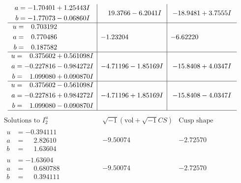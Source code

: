 \documentclass[1p]{elsarticle_modified}
\theoremstyle{definition}
\newcommand{\I}{\sqrt{-1}}
\begin{document}
$$\begin{array}{c|c|c}
\begin{aligned}
a &= -1.70401 + 1.25443 I \\
b &= -1.77073 - 0.06860 I\end{aligned}
 & \phantom{-}19.3766 - 6.2041 I & -18.9481 + 3.7555 I \\ \hline\begin{aligned}
u &= \phantom{-}0.703192\phantom{ +0.000000I} \\
a &= \phantom{-}0.770486\phantom{ +0.000000I} \\
b &= \phantom{-}0.187582\phantom{ +0.000000I}\end{aligned}
 & -1.23204\phantom{ +0.000000I} & -6.62220\phantom{ +0.000000I} \\ \hline\begin{aligned}
u &= \phantom{-}0.375602 + 0.561098 I \\
a &= -0.227816 - 0.984272 I \\
b &= \phantom{-}1.099080 + 0.090870 I\end{aligned}
 & -4.71196 - 1.85169 I & -15.8408 + 4.0347 I \\ \hline\begin{aligned}
u &= \phantom{-}0.375602 - 0.561098 I \\
a &= -0.227816 + 0.984272 I \\
b &= \phantom{-}1.099080 - 0.090870 I\end{aligned}
 & -4.71196 + 1.85169 I & -15.8408 - 4.0347 I\\
 \hline 
 \end{array}$$\newpage$$\begin{array}{c|c|c}  
\text{Solutions to }I^u_{2}& \I (\text{vol} + \sqrt{-1}CS) & \text{Cusp shape}\\
 \hline 
\begin{aligned}
u &= -0.394111\phantom{ +0.000000I} \\
a &= \phantom{-}2.82610\phantom{ +0.000000I} \\
b &= \phantom{-}1.63604\phantom{ +0.000000I}\end{aligned}
 & -9.50074\phantom{ +0.000000I} & -2.72570\phantom{ +0.000000I} \\ \hline\begin{aligned}
u &= -1.63604\phantom{ +0.000000I} \\
a &= \phantom{-}0.680788\phantom{ +0.000000I} \\
b &= \phantom{-}0.394111\phantom{ +0.000000I}\end{aligned}
 & -9.50074\phantom{ +0.000000I} & -2.72570\phantom{ +0.000000I} \\ \hline\begin{aligned}

\end{aligned}
\end{array}$$
\end{document}
